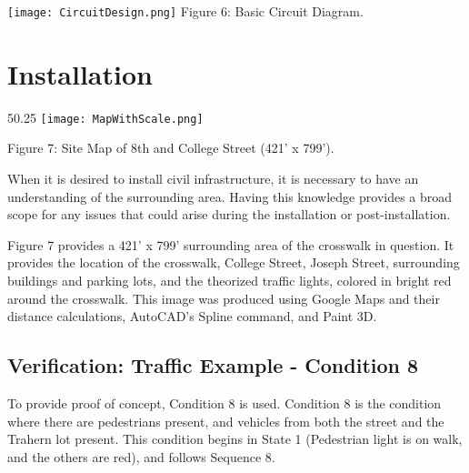 \documentclass{article}
\begin{document}
\begin{center}
\texttt{[image: CircuitDesign.png]}
\scriptsize{
Figure 6: Basic Circuit Diagram.
}
\end{center}



\section{Installation}
\begin{wrapfigure}{5}{0.25\textwidth}
\texttt{[image: MapWithScale.png]} 
\begin{center}
\scriptsize{
Figure 7: Site Map of 8th and College Street (421' x 799').
}
\end{center}
\end{wrapfigure}

When it is desired to install civil infrastructure, it is necessary to have an understanding of the surrounding area. Having this knowledge provides a broad scope for any issues that could arise during the installation or post-installation. \vspace{0.075in}

Figure 7 provides a 421' x 799' surrounding area of the crosswalk in question. It provides the location of the crosswalk, College Street, Joseph Street, surrounding buildings and parking lots, and the theorized traffic lights, colored in bright red around the crosswalk. This image was produced using Google Maps and their distance calculations, AutoCAD's Spline command, and Paint 3D.

\subsection{Verification: Traffic Example - Condition 8}
To provide proof of concept, Condition 8 is used. Condition 8 is the condition where there are pedestrians present, and vehicles from both the street and the Trahern lot present. This condition begins in State 1 (Pedestrian light is on walk, and the others are red), and follows Sequence 8.
\end{document}
